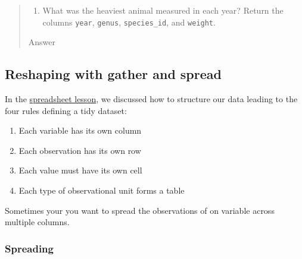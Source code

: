 \documentclass[]{book}
\newenvironment{Shaded}{\begin{snugshade}}{\end{snugshade}}
\newcommand{\KeywordTok}[1]{\textcolor[rgb]{0.13,0.29,0.53}{\textbf{#1}}}
\newcommand{\StringTok}[1]{\textcolor[rgb]{0.31,0.60,0.02}{#1}}
\newcommand{\OperatorTok}[1]{\textcolor[rgb]{0.81,0.36,0.00}{\textbf{#1}}}
\newcommand{\NormalTok}[1]{#1}
\providecommand{\tightlist}{%
  \setlength{\itemsep}{0pt}\setlength{\parskip}{0pt}}
\begin{document}
\begin{quote}
\begin{enumerate}
\def\labelenumi{\arabic{enumi}.}
\setcounter{enumi}{2}
\tightlist
\item
  What was the heaviest animal measured in each year? Return the columns
  \texttt{year}, \texttt{genus}, \texttt{species\_id}, and
  \texttt{weight}.
\end{enumerate}

Answer

\begin{Shaded}
\end{Shaded}
\end{quote}

\subsection{Reshaping with gather and
spread}\label{reshaping-with-gather-and-spread}

In the
\href{http://www.datacarpentry.org/spreadsheet-ecology-lesson/01-format-data/}{spreadsheet
lesson}, we discussed how to structure our data leading to the four
rules defining a tidy dataset:

\begin{enumerate}
\def\labelenumi{\arabic{enumi}.}
\tightlist
\item
  Each variable has its own column
\item
  Each observation has its own row
\item
  Each value must have its own cell
\item
  Each type of observational unit forms a table
\end{enumerate}

Sometimes your you want to spread the observations of on variable across
multiple columns.

\subsubsection{Spreading}\label{spreading}
\end{document}
